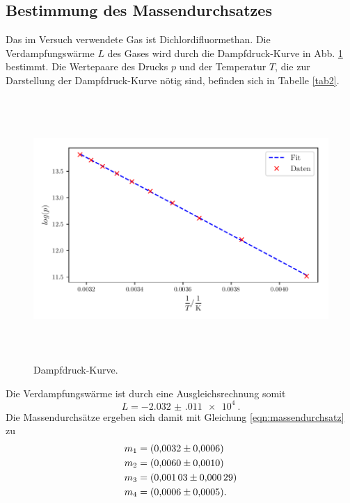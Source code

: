 \subsection{Bestimmung des Massendurchsatzes}
Das im Versuch verwendete Gas ist Dichlordifluormethan.
Die Verdampfungswärme $L$ des Gases wird durch die Dampfdruck-Kurve
in Abb. \ref{fig:plot2} bestimmt. %
Die Wertepaare des Drucks $p$ und der Temperatur $T$, die zur
Darstellung der Dampfdruck-Kurve nötig sind, befinden sich in
Tabelle \ref{tab2}. 

\begin{figure}
    \centering
    \includegraphics[width=14cm, height=10cm]{build/plot2.pdf}
    \caption{Dampfdruck-Kurve.}
    \label{fig:plot2}
\end{figure}
Die Verdampfungswärme ist durch eine Ausgleichsrechnung somit %
\begin{equation*}
    L = \SI{-2.032(011)e4}{}. %
\end{equation*}
Die Massendurchsätze ergeben sich damit mit Gleichung \eqref{eqn:massendurchsatz} zu %
\begin{align*}
    m_1 &= \SI{0.0032 \pm 0.0006}{} \\
    m_2 &= \SI{0.0060 \pm 0.0010}{} \\
    m_3 &= \SI{0.00103 \pm 0.00029}{} \\
    m_4 &= \SI{0.0006 \pm 0.0005}{}. %
\end{align*}

